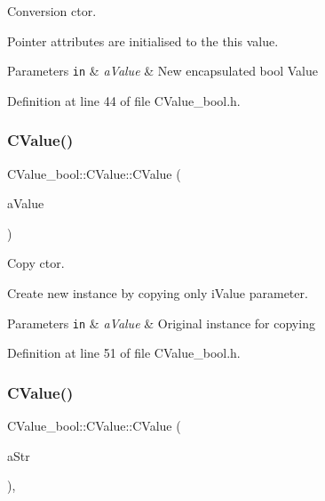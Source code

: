 Conversion c\textquotesingle{}tor. 

Pointer attributes are initialised to the {\ttfamily this} value. 
\begin{DoxyParams}[1]{Parameters}
\mbox{\tt in}  & {\em a\+Value} & New encapsulated {\ttfamily bool} Value \\
\hline
\end{DoxyParams}


Definition at line 44 of file C\+Value\+\_\+bool.\+h.

\mbox{\label{class_c_value__bool_1_1_c_value_abc234c189a9447eb7859f8c7731122e1}} 
\subsubsection{\texorpdfstring{C\+Value()}{CValue()}\hspace{0.1cm}{\footnotesize\ttfamily [3/4]}}
{\footnotesize\ttfamily C\+Value\+\_\+bool\+::\+C\+Value\+::\+C\+Value (\begin{DoxyParamCaption}\item[{const \hyperlink{class_c_value__bool_1_1_c_value}{C\+Value} \&}]{a\+Value }\end{DoxyParamCaption})\hspace{0.3cm}{\ttfamily [inline]}}



Copy c\textquotesingle{}tor. 

Create new instance by copying only {\ttfamily i\+Value} parameter. 
\begin{DoxyParams}[1]{Parameters}
\mbox{\tt in}  & {\em a\+Value} & Original instance for copying \\
\hline
\end{DoxyParams}


Definition at line 51 of file C\+Value\+\_\+bool.\+h.

\mbox{\label{class_c_value__bool_1_1_c_value_a8883e123d12aed4cd3ca24db42ea0049}} 
\subsubsection{\texorpdfstring{C\+Value()}{CValue()}\hspace{0.1cm}{\footnotesize\ttfamily [4/4]}}
{\footnotesize\ttfamily C\+Value\+\_\+bool\+::\+C\+Value\+::\+C\+Value (\begin{DoxyParamCaption}\item[{const char $\ast$}]{a\+Str }\end{DoxyParamCaption})\hspace{0.3cm}{\ttfamily [inline]}, {\ttfamily [explicit]}}



